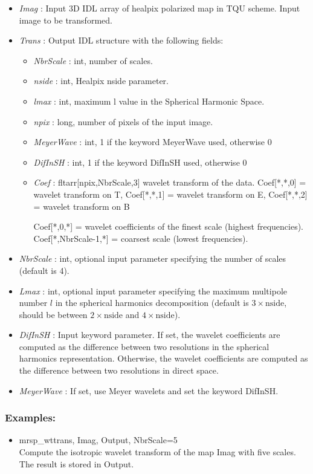 \begin{itemize}
\item {\em Imag} : Input 3D IDL array of healpix polarized map in TQU scheme. Input image to be transformed.
\item {\em Trans} : Output IDL structure with the following fields:
\begin{itemize}
\item {\em NbrScale} : int, number of scales.
\item {\em nside} : int, Healpix nside parameter.
\item {\em lmax} : int, maximum l value in the Spherical Harmonic Space.
\item {\em npix} : long, number of pixels of the input image.
\item {\em MeyerWave} : int, 1 if the keyword MeyerWave used, otherwise 0
\item {\em DifInSH} : int, 1 if the keyword DifInSH used, otherwise 0
\item {\em Coef} : fltarr[npix,NbrScale,3] wavelet transform of the data. Coef[*,*,0] = wavelet transform on T, Coef[*,*,1] = wavelet transform on E, Coef[*,*,2] = wavelet transform on B
\begin{center}
Coef[*,0,*] = wavelet coefficients of the finest scale (highest frequencies).\\
Coef[*,NbrScale-1,*] = coarsest scale (lowest frequencies). 
\end{center}
\end{itemize}
\item {\em NbrScale} : int, optional input parameter specifying the number of scales (default is 4).
\item {\em Lmax} : int, optional input parameter specifying the maximum multipole number $l$ in the spherical harmonics decomposition 
(default is $3\times \textrm{nside}$, should be between $2\times \textrm{nside}$ and $4\times \textrm{nside}$).
\item {\em DifInSH} : Input keyword parameter. If set, the wavelet coefficients are computed as the difference between two resolutions in the spherical harmonics representation. 
Otherwise, the wavelet coefficients are computed as the difference between two resolutions in direct space.
\item {\em MeyerWave} : If set, use Meyer wavelets and set the keyword DifInSH.
\end{itemize}

\subsubsection*{Examples:} 
\begin{itemize}
\item mrsp\_wttrans, Imag, Output, NbrScale=5 \\
Compute the isotropic wavelet transform of the map Imag with five scales. The result is stored in Output.
\end{itemize}



